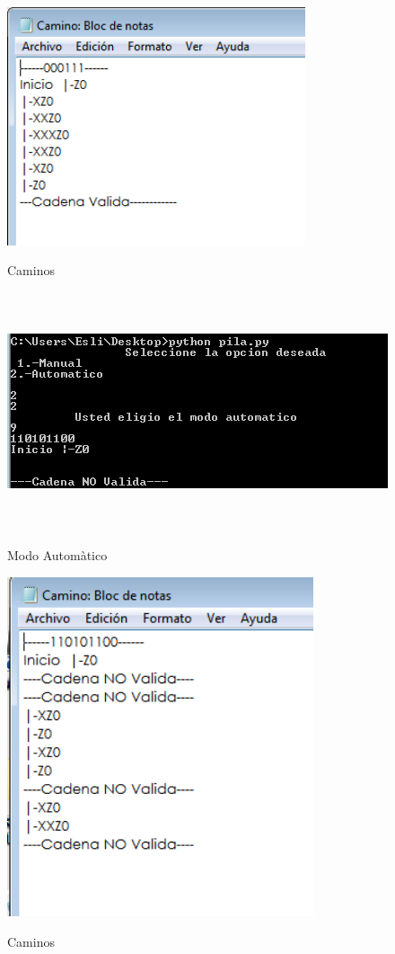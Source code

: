 \documentclass[12pt]{article}
\begin{document}
\begin{figure}[H]
\includegraphics[width=\textwidth, height=7cm]{manual_pila_caminos}
\label{fig:manual_afn}
\caption{Caminos}
\end{figure}

\begin{figure}[H]
\includegraphics[width=\textwidth, height=7cm]{auto_pila}
\label{fig:manual_afn}
\caption{Modo Automàtico}
\end{figure}

\begin{figure}[H]
\includegraphics[width=\textwidth, height=10cm]{auto_pila_caminos}
\label{fig:manual_afn}
\caption{Caminos}
\end{figure}
\end{document}
